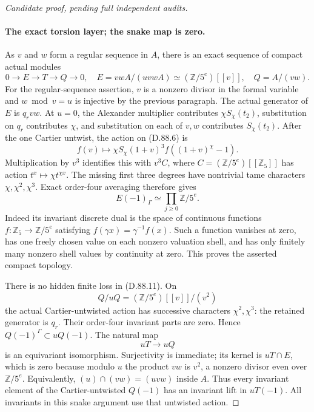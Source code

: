 \begin{proof}[Candidate proof, pending full independent audits]
\paragraph{The exact torsion layer; the snake map is zero.}
As \(v\) and \(w\) form a regular sequence in \(A\),
there is an exact sequence of compact actual modules
\[
 0\longrightarrow E\longrightarrow T\longrightarrow Q
      \longrightarrow0,
 \quad E=vwA/(uvwA)\simeq(\mathbb Z/5^e)[[v]],
 \quad Q=A/(vw).                                      \tag{D.88.9}
\]
For the regular-sequence assertion, \(v\) is a nonzero
 divisor in the formal variable and \(w\bmod v=u\) is
injective by the previous paragraph. The actual generator of
\(E\) is \(q_rvw\). At \(u=0\), the Alexander multiplier
contributes \(\chi S_\chi(t_2)\), substitution on \(q_r\)
contributes \(\chi\), and substitution on each of \(v,w\)
contributes \(S_\chi(t_2)\). After the one Cartier untwist,
the action on (D.88.6) is
\[
 f(v)\longmapsto\chi S_\chi(1+v)^3
                         f((1+v)^\chi-1).             \tag{D.88.10}
\]
Multiplication by \(v^3\) identifies this with
\(v^3C\), where \(C=(\mathbb Z/5^e)[[\mathbb Z_5]]\)
has action \(t^x\mapsto\chi t^{\chi x}\).
The missing first three degrees have nontrivial tame
characters \(\chi,\chi^2,\chi^3\). Exact order-four
averaging therefore gives
\[
                     E(-1)_\Gamma\simeq
                           \prod_{j\ge0}\mathbb Z/5^e.
                                                               \tag{D.88.11}
\]
Indeed its invariant discrete dual is the space of continuous
functions \(f:\mathbb Z_5\to\mathbb Z/5^e\) satisfying
\(f(\gamma x)=\gamma^{-1}f(x)\). Such a function vanishes
at zero, has one freely chosen value on each nonzero valuation
shell, and has only finitely many nonzero shell values by
continuity at zero. This proves the asserted compact topology.

There is no hidden finite loss in (D.88.11). On
\[
             Q/uQ=(\mathbb Z/5^e)[[v]]/(v^2)
\]
the actual Cartier-untwisted action has successive characters
\(\chi^2,\chi^3\): the retained generator is \(q_r\).
Their order-four invariant parts are zero. Hence
\(Q(-1)^\Gamma\subset uQ(-1)\). The natural map
\[
                              uT\longrightarrow uQ
                                                               \tag{D.88.12}
\]
is an equivariant isomorphism. Surjectivity is immediate;
its kernel is \(uT\cap E\), which is zero because modulo
\(u\) the product \(vw\) is \(v^2\), a nonzero divisor
even over \(\mathbb Z/5^e\). Equivalently,
\((u)\cap(vw)=(uvw)\) inside \(A\).
Thus every invariant element of the Cartier-untwisted
\(Q(-1)\) has an invariant lift in \(uT(-1)\). All
invariants in this snake argument use that untwisted action.


\end{proof}

